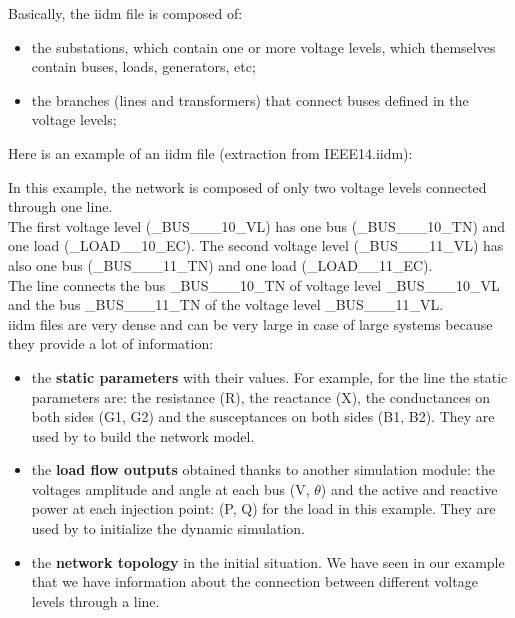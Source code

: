 \documentclass[a4paper, 12pt]{report}
\begin{document}
Basically, the iidm file is composed of:
\begin{itemize}
\item the substations, which contain one or more voltage levels, which themselves contain buses, loads, generators, etc;
\item the branches (lines and transformers) that connect buses defined in the voltage levels;
\end{itemize}

Here is an example of an iidm file (extraction from IEEE14.iidm):


In this example, the network is composed of only two voltage levels connected through one line. \\

The first voltage level (\_BUS\_\_\_10\_VL) has one bus (\_BUS\_\_\_10\_TN) and one load (\_LOAD\_\_10\_EC). The second voltage level (\_BUS\_\_\_11\_VL) has also one bus (\_BUS\_\_\_11\_TN) and one load (\_LOAD\_\_11\_EC). \\

The line connects the bus \_BUS\_\_\_10\_TN of voltage level \_BUS\_\_\_10\_VL and the bus \_BUS\_\_\_11\_TN of the voltage level \_BUS\_\_\_11\_VL. \\

iidm files are very dense and can be very large in case of large systems because they provide a lot of information:
\begin{itemize}
\item the \textbf{static parameters} with their values. For example, for the line the static parameters are: the resistance (R), the reactance (X), the conductances on both sides (G1, G2) and the susceptances on both sides (B1, B2).  They are used by \Dynawo to build the network model.
\item the \textbf{load flow outputs} obtained thanks to another simulation module: the voltages amplitude and angle at each bus (V, $\theta$) and the active and reactive power at each injection point: (P, Q) for the load in this example. They are used by \Dynawo to initialize the dynamic simulation.
\item the \textbf{network topology} in the initial situation. We have seen in our example that we have information about the connection between different voltage levels through a line.
\end{itemize}
\end{document}
